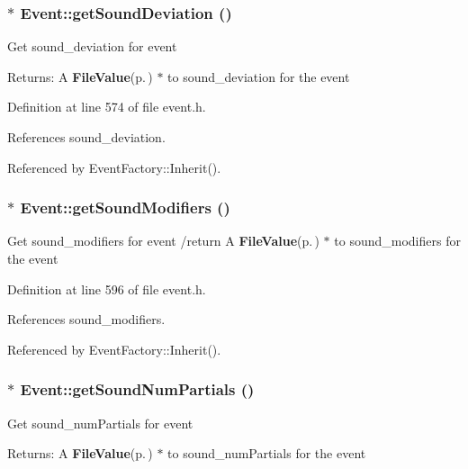 \subsubsection{$\ast$ Event::get\-Sound\-Deviation ()\hspace{0.3cm}{\tt  [inline]}}\label{classEvent_a66}


Get sound\_\-deviation for event \begin{Desc}
\item[Returns:]A {\bf File\-Value}{\rm (p.\,\pageref{classFileValue})} $\ast$ to sound\_\-deviation for the event \end{Desc}


Definition at line 574 of file event.h.

References sound\_\-deviation.

Referenced by Event\-Factory::Inherit().
\subsubsection{$\ast$ Event::get\-Sound\-Modifiers ()\hspace{0.3cm}{\tt  [inline]}}\label{classEvent_a70}


Get sound\_\-modifiers for event /return A {\bf File\-Value}{\rm (p.\,\pageref{classFileValue})} $\ast$ to sound\_\-modifiers for the event 

Definition at line 596 of file event.h.

References sound\_\-modifiers.

Referenced by Event\-Factory::Inherit().
\subsubsection{$\ast$ Event::get\-Sound\-Num\-Partials ()\hspace{0.3cm}{\tt  [inline]}}\label{classEvent_a64}


Get sound\_\-num\-Partials for event \begin{Desc}
\item[Returns:]A {\bf File\-Value}{\rm (p.\,\pageref{classFileValue})} $\ast$ to sound\_\-num\-Partials for the event \end{Desc}



